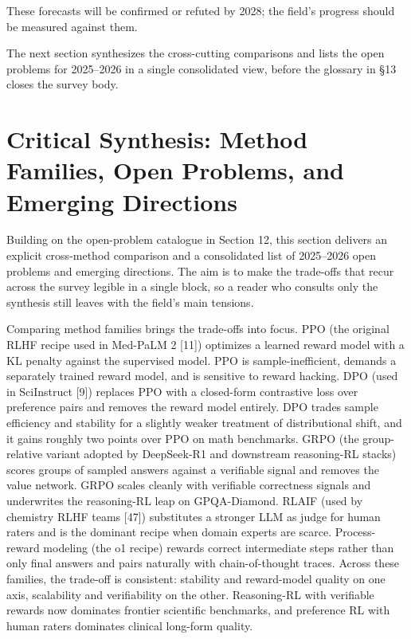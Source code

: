 These forecasts will be confirmed or refuted by 2028; the field's progress should be measured against them.

The next section synthesizes the cross-cutting comparisons and lists the open problems for 2025--2026 in a single consolidated view, before the glossary in §13 closes the survey body.

\section{Critical Synthesis: Method Families, Open Problems, and Emerging Directions}\label{critical-synthesis-method-families-open-problems-and-emerging-directions}

Building on the open-problem catalogue in Section 12, this section delivers an explicit cross-method comparison and a consolidated list of 2025--2026 open problems and emerging directions. The aim is to make the trade-offs that recur across the survey legible in a single block, so a reader who consults only the synthesis still leaves with the field's main tensions.

Comparing method families brings the trade-offs into focus. PPO (the original RLHF recipe used in Med-PaLM 2 {[}11{]}) optimizes a learned reward model with a KL penalty against the supervised model. PPO is sample-inefficient, demands a separately trained reward model, and is sensitive to reward hacking. DPO (used in SciInstruct {[}9{]}) replaces PPO with a closed-form contrastive loss over preference pairs and removes the reward model entirely. DPO trades sample efficiency and stability for a slightly weaker treatment of distributional shift, and it gains roughly two points over PPO on math benchmarks. GRPO (the group-relative variant adopted by DeepSeek-R1 and downstream reasoning-RL stacks) scores groups of sampled answers against a verifiable signal and removes the value network. GRPO scales cleanly with verifiable correctness signals and underwrites the reasoning-RL leap on GPQA-Diamond. RLAIF (used by chemistry RLHF teams {[}47{]}) substitutes a stronger LLM as judge for human raters and is the dominant recipe when domain experts are scarce. Process-reward modeling (the o1 recipe) rewards correct intermediate steps rather than only final answers and pairs naturally with chain-of-thought traces. Across these families, the trade-off is consistent: stability and reward-model quality on one axis, scalability and verifiability on the other. Reasoning-RL with verifiable rewards now dominates frontier scientific benchmarks, and preference RL with human raters dominates clinical long-form quality.

